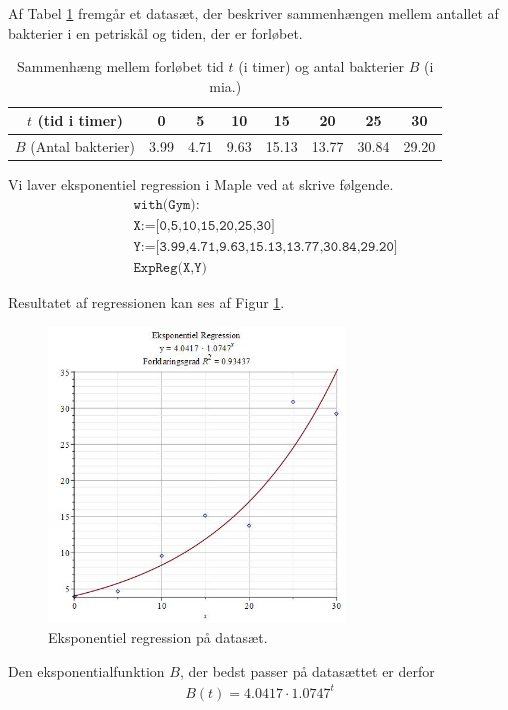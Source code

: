 \begin{exa}
Af Tabel \ref{tab:1} fremgår et datasæt, der beskriver sammenhængen mellem antallet af bakterier i en petriskål og tiden, der er forløbet.
\begin{table}[H]
	\centering
	\begin{tabular}{c|c|c|c|c|c|c|c}
		$t$ (tid i timer) & 0 & 5 & 10 & 15 & 20 & 25 & 30\\
		\hline
		$B$ (Antal bakterier) & 3.99 & 4.71 & 9.63 & 15.13 & 13.77 & 30.84 & 29.20
	\end{tabular}
	\caption{Sammenhæng mellem forløbet tid $t$ (i timer) og antal bakterier $B$ (i mia.)}
	\label{tab:1}
\end{table}

Vi laver eksponentiel regression i Maple ved at skrive følgende.
\begin{align*}
	&\texttt{with(Gym):}\\
	&\texttt{X:=[0,5,10,15,20,25,30]}\\
	&\texttt{Y:=[3.99,4.71,9.63,15.13,13.77,30.84,29.20]}\\
	&\texttt{ExpReg(X,Y)}
\end{align*}

Resultatet af regressionen kan ses af Figur \ref{fig:regres}.
\begin{figure}[H]
	\centering
	\includegraphics[width=0.7\textwidth]{Billeder/EkspReg.jpg}
	\caption{Eksponentiel regression på datasæt.}
	\label{fig:regres}
\end{figure}
Den eksponentialfunktion $B$, der bedst passer på datasættet er derfor
\begin{align*}
	B(t) = 4.0417\cdot 1.0747^t
\end{align*}

\end{exa}

